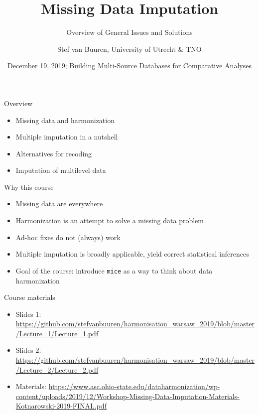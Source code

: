 \documentclass[ignorenonframetext,aspectratio=43]{beamer}
\title{Missing Data Imputation}
\subtitle{Overview of General Issues and Solutions}
\author{Stef van Buuren, University of Utrecht \& TNO}
\date{December 19, 2019; Building Multi-Source Databases for Comparative
Analyses}
\providecommand{\tightlist}{%
  \setlength{\itemsep}{0pt}\setlength{\parskip}{0pt}}
\begin{document}
\frame{\titlepage}

\begin{frame}
\tableofcontents[hideallsubsections]
\end{frame}
\begin{frame}{Overview}
\protect\hypertarget{overview}{}

\begin{itemize}
\tightlist
\item
  Missing data and harmonization
\item
  Multiple imputation in a nutshell
\item
  Alternatives for recoding
\item
  Imputation of multilevel data
\end{itemize}

\end{frame}

\begin{frame}[fragile]{Why this course}
\protect\hypertarget{why-this-course}{}

\begin{itemize}
\tightlist
\item
  Missing data are everywhere
\item
  Harmonization is an attempt to solve a missing data problem
\item
  Ad-hoc fixes do not (always) work
\item
  Multiple imputation is broadly applicable, yield correct statistical
  inferences
\item
  Goal of the course: introduce \texttt{mice} as a way to think about
  data harmonization
\end{itemize}

\end{frame}

\begin{frame}{Course materials}
\protect\hypertarget{course-materials}{}

\begin{itemize}
\item
  Slides 1:
  \url{https://github.com/stefvanbuuren/harmonisation_warsaw_2019/blob/master/Lecture_1/Lecture_1.pdf}
\item
  Slides 2:
  \url{https://github.com/stefvanbuuren/harmonisation_warsaw_2019/blob/master/Lecture_2/Lecture_2.pdf}
\item
  Materials:
  \url{https://www.asc.ohio-state.edu/dataharmonization/wp-content/uploads/2019/12/Workshop-Missing-Data-Imputation-Materials-Kotnarowski-2019-FINAL.pdf}
\end{itemize}

\end{frame}
\end{document}
